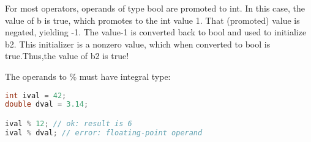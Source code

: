 For most operators, operands of type bool are promoted to int. In this case, the value of b is true, which promotes to the int value 1. That (promoted) value is negated, yielding -1. The value-1 is converted back to bool and used to initialize b2. This initializer is a nonzero value, which when converted to bool is true.Thus,the value of b2 is true!

The operands to \% must have integral type:
\begin{lstlisting}[language=C++]
int ival = 42; 
double dval = 3.14; 

ival % 12; // ok: result is 6 
ival % dval; // error: floating-point operand
\end{lstlisting}